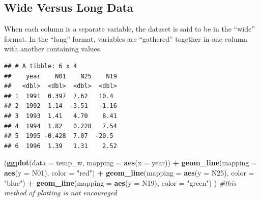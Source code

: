 \documentclass[11pt,]{article}
\newenvironment{Shaded}{\begin{snugshade}}{\end{snugshade}}
\newcommand{\KeywordTok}[1]{\textcolor[rgb]{0.13,0.29,0.53}{\textbf{#1}}}
\newcommand{\DataTypeTok}[1]{\textcolor[rgb]{0.13,0.29,0.53}{#1}}
\newcommand{\DecValTok}[1]{\textcolor[rgb]{0.00,0.00,0.81}{#1}}
\newcommand{\StringTok}[1]{\textcolor[rgb]{0.31,0.60,0.02}{#1}}
\newcommand{\CommentTok}[1]{\textcolor[rgb]{0.56,0.35,0.01}{\textit{#1}}}
\newcommand{\OperatorTok}[1]{\textcolor[rgb]{0.81,0.36,0.00}{\textbf{#1}}}
\newcommand{\NormalTok}[1]{#1}
\begin{document}
\subsection{Wide Versus Long Data}\label{wide-versus-long-data}

When each column is a separate variable, the dataset is said to be in
the ``wide'' format. In the ``long'' format, variables are ``gathered''
together in one column with another containing values.

\begin{Shaded}
\end{Shaded}

\begin{verbatim}
## # A tibble: 6 x 4
##    year    N01    N25    N19
##   <dbl>  <dbl>  <dbl>  <dbl>
## 1  1991  0.397  7.62   10.4 
## 2  1992  1.14  -3.51   -1.16
## 3  1993  1.41   4.70    8.41
## 4  1994  1.82   0.228   7.54
## 5  1995 -0.428  7.07  -20.5 
## 6  1996  1.39   1.31    2.52
\end{verbatim}

\begin{Shaded}
\begin{Highlighting}[]
\NormalTok{(}\KeywordTok{ggplot}\NormalTok{(}\DataTypeTok{data =}\NormalTok{ temp_w,}
        \DataTypeTok{mapping =} \KeywordTok{aes}\NormalTok{(}\DataTypeTok{x =}\NormalTok{ year)) }\OperatorTok{+}\StringTok{ }
\StringTok{    }\KeywordTok{geom_line}\NormalTok{(}\DataTypeTok{mapping =} \KeywordTok{aes}\NormalTok{(}\DataTypeTok{y =}\NormalTok{ N01), }\DataTypeTok{color =} \StringTok{"red"}\NormalTok{) }\OperatorTok{+}
\StringTok{    }\KeywordTok{geom_line}\NormalTok{(}\DataTypeTok{mapping =} \KeywordTok{aes}\NormalTok{(}\DataTypeTok{y =}\NormalTok{ N25), }\DataTypeTok{color =} \StringTok{"blue"}\NormalTok{) }\OperatorTok{+}
\StringTok{    }\KeywordTok{geom_line}\NormalTok{(}\DataTypeTok{mapping =} \KeywordTok{aes}\NormalTok{(}\DataTypeTok{y =}\NormalTok{ N19), }\DataTypeTok{color =} \StringTok{"green"}\NormalTok{)}
\NormalTok{  ) }\CommentTok{#this method of plotting is not encouraged}
\end{Highlighting}
\end{Shaded}
\end{document}
